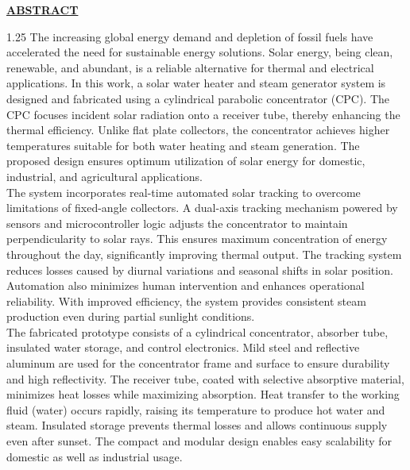 \documentclass[12pt,a4paper]{article}
\begin{document}
\vspace*{-5mm}
\begin{center}
  {\fontsize{18}{22}\selectfont \bfseries \textcolor{red!80!black}{\underline{ABSTRACT}}}\\[6mm]
\end{center}

\noindent
\begin{spacing}{1.25}
{\fontsize{10.2}{14}\selectfont
The increasing global energy demand and depletion of fossil fuels have accelerated the need for sustainable energy solutions. Solar energy, being clean, renewable, and abundant, is a reliable alternative for thermal and electrical applications. In this work, a solar water heater and steam generator system is designed and fabricated using a cylindrical parabolic concentrator (CPC). The CPC focuses incident solar radiation onto a receiver tube, thereby enhancing the thermal efficiency. Unlike flat plate collectors, the concentrator achieves higher temperatures suitable for both water heating and steam generation. The proposed design ensures optimum utilization of solar energy for domestic, industrial, and agricultural applications.\\[2.5mm]
The system incorporates real-time automated solar tracking to overcome limitations of fixed-angle collectors. A dual-axis tracking mechanism powered by sensors and microcontroller logic adjusts the concentrator to maintain perpendicularity to solar rays. This ensures maximum concentration of energy throughout the day, significantly improving thermal output. The tracking system reduces losses caused by diurnal variations and seasonal shifts in solar position. Automation also minimizes human intervention and enhances operational reliability. With improved efficiency, the system provides consistent steam production even during partial sunlight conditions.\\[2.5mm]
The fabricated prototype consists of a cylindrical concentrator, absorber tube, insulated water storage, and control electronics. Mild steel and reflective aluminum are used for the concentrator frame and surface to ensure durability and high reflectivity. The receiver tube, coated with selective absorptive material, minimizes heat losses while maximizing absorption. Heat transfer to the working fluid (water) occurs rapidly, raising its temperature to produce hot water and steam. Insulated storage prevents thermal losses and allows continuous supply even after sunset. The compact and modular design enables easy scalability for domestic as well as industrial usage.\\[2.5mm]
}
\end{spacing}
\end{document}

